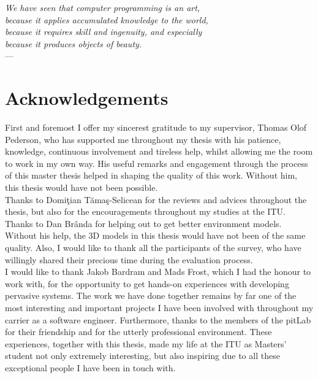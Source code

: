 
\begin{flushright}{\slshape    
    We have seen that computer programming is an art, \\ 
    because it applies accumulated knowledge to the world, \\ 
    because it requires skill and ingenuity, and especially \\
    because it produces objects of beauty.} \\ \medskip
    ---  \citep{knuth:1974}
\end{flushright}


\bigskip

\begingroup
\let\clearpage\relax
\let\cleardoublepage\relax
\let\cleardoublepage\relax
\chapter*{Acknowledgements}
First and foremost I offer my sincerest gratitude to my supervisor, Thomas Olof Pederson, who has supported me throughout my thesis with his patience, knowledge, continuous involvement and tireless help, whilst allowing me the room to work in my own way. His useful remarks and engagement through the process of this master thesis helped in shaping the quality of this work. Without him, this thesis would have not been possible.\\

Thanks to Domi\c tian T\u ama\c s-Selicean for the reviews and advices throughout the thesis, but also for the encouragements throughout my studies at the ITU. Thanks to Dan Br\^{a}nda for helping out to get better environment models. Without his help, the 3D models in this thesis would have not been of the same quality. Also, I would like to thank all the participants of the survey, who have willingly shared their precious time during the evaluation process.\\

I would like to thank Jakob Bardram and Mads Frost, which I had the honour to work with, for the opportunity to get hands-on experiences with developing pervasive systems. The work we have done together remains by far one of the most interesting and important projects I have been involved with throughout my carrier as a software engineer. Furthermore, thanks to the members of the pitLab for their friendship and for the utterly professional environment. These experiences, together with this thesis, made my life at the ITU as Masters' student not only extremely interesting, but also inspiring due to all these exceptional people I have been in touch with.\\

